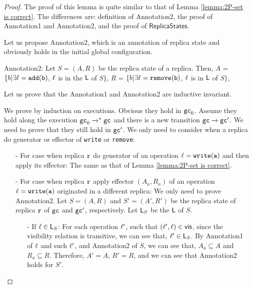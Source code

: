 \begin {proof}

The proof of this lemma is quite similar to that of Lemma \ref{lemma:2P-set is correct}. The differences are: definition of Annotation2, the proof of Annotation1 and Annotation2, and the proof of $\mathsf{ReplicaStates}$.

Let us propose Annotation2, which is an annotation of replica state and obviously holds in the initial global configuration.

\noindent Annotation2: Let $S = (A,R)$ be the replica state of a replica. Then, $A$ =  $\{ b \vert \exists \alabel = \alabelshort[{\tt add}]{b}$, $\ell$ is in the $\mathsf{L}$ of $S\}$,
    $R$ =  $\{ b \vert \exists \alabel = \alabelshort[{\tt remove}]{b}$, $\ell$ is in $\mathsf{L}$ of $S\}$,

Let us prove that the Annotation1 and Annotation2 are inductive invariant.

We prove by induction on executions. Obvious they hold in $\mathtt{gc}_0$. Assume they hold along the execution $\mathtt{gc}_0 \xrightarrow{}^* \mathtt{gc}$ and there is a new transition $\mathtt{gc} \xrightarrow{} \mathtt{gc}'$. We need to prove that they still hold in $\mathtt{gc}'$. We only need to consider when a replica do generator or effector of {\tt write} or {\tt remove}:

\begin{itemize}
\setlength{\itemsep}{0.5pt}
\item[-] For case when replica $\mathtt{r}$ do generator of an operation $\alabel = \alabelshort[{\tt write}]{a}$ and then apply its effector: The same as that of Lemma \ref{lemma:2P-set is correct}.

\item[-] For case when replica $\mathtt{r}$ apply effector $(A_a,R_a)$ of an operation $\alabel = \alabelshort[{\tt write}]{a}$ originated in a different replica: We only need to prove Annotation2. Let $S=(A,R)$ and $S'=(A',R')$ be the replica state of replica $\mathtt{r}$ of $\mathtt{gc}$ and $\mathtt{gc}'$, respectively. Let $\mathsf{L}_S$ be the $\mathsf{L}$ of $S$.

    \begin{itemize}
    \setlength{\itemsep}{0.5pt}
    \item[-] If $\ell \in \mathsf{L}_S$: For each operation $\ell'$, such that $(\ell',\ell) \in \mathsf{vis}$, since the visibility relation is transitive, we can see that, $\ell' \in \mathsf{L}_S$. By Annotation1 of $\ell$ and such $\ell'$, and Annotation2 of $S$, we can see that, $A_a \subseteq A$ and $R_a \subseteq R$. Therefore, $A' = A$, $R' = R$, and we can see that Annotation2 holds for $S'$.


\end{itemize}
\end{itemize}
\end{proof}
